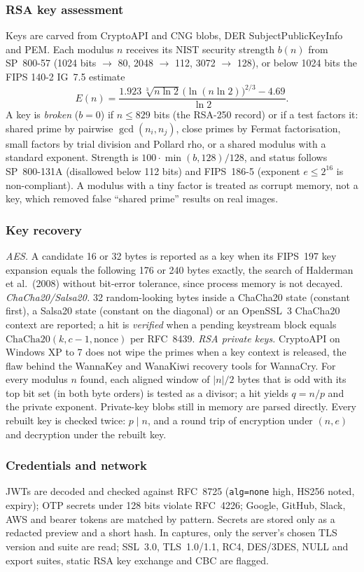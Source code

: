 \subsubsection{RSA key assessment}
Keys are carved from CryptoAPI and CNG blobs, DER SubjectPublicKeyInfo and PEM. Each modulus $n$ receives its
NIST security strength $b(n)$ from SP~800-57 (1024 bits $\to$ 80, 2048 $\to$ 112,
3072 $\to$ 128), or below 1024 bits the FIPS 140-2 IG~7.5 estimate
\begin{equation}
  E(n) = \frac{1.923\,\sqrt[3]{n\ln 2}\,\big(\ln(n\ln 2)\big)^{2/3} - 4.69}{\ln 2}.
\end{equation}
A key is \emph{broken} ($b=0$) if $n \le 829$ bits (the RSA-250 record) or if a test factors it:
shared prime by pairwise $\gcd(n_i,n_j)$, close primes by Fermat factorisation, small
factors by trial division and Pollard rho, or a shared modulus with a standard exponent. Strength is
$100\cdot\min(b,128)/128$, and status follows SP~800-131A (disallowed below 112 bits) and
FIPS~186-5 (exponent $e \le 2^{16}$ is non-compliant). A modulus with a tiny factor is treated
as corrupt memory, not a key, which removed false ``shared prime'' results on real images.

\subsubsection{Key recovery}
\textit{AES.} A candidate 16 or 32 bytes is reported as a key when its FIPS~197 key expansion
equals the following 176 or 240 bytes exactly, the search of Halderman et al.\ (2008) without
bit-error tolerance, since process memory is not decayed.
\textit{ChaCha20/Salsa20.} 32 random-looking bytes inside a ChaCha20 state (constant first), a Salsa20 state
(constant on the diagonal) or an OpenSSL~3 ChaCha20 context are reported; a hit is \emph{verified} when a
pending keystream block equals $\mathrm{ChaCha20}(k, c-1, \text{nonce})$ per RFC~8439.
\textit{RSA private keys.} CryptoAPI on Windows XP to 7 does not wipe the primes when a key context is
released, the flaw behind the WannaKey and WanaKiwi recovery tools for WannaCry. For every modulus $n$ found,
each aligned window of $|n|/2$ bytes that is odd with its top bit set (in both byte orders) is tested as a
divisor; a hit yields $q=n/p$ and the private exponent. Private-key blobs still in memory are parsed directly.
Every rebuilt key is checked twice: $p \mid n$, and a round trip of encryption under $(n,e)$ and decryption
under the rebuilt key.

\subsubsection{Credentials and network}
JWTs are decoded and checked against RFC~8725 (\texttt{alg=none} high, HS256 noted, expiry);
OTP secrets under 128 bits violate RFC~4226; Google, GitHub, Slack, AWS and bearer tokens are
matched by pattern. Secrets are stored only as a redacted preview and a short hash. In captures, only the
server's chosen TLS version and suite are read; SSL~3.0, TLS~1.0/1.1, RC4, DES/3DES, NULL and
export suites, static RSA key exchange and CBC are flagged.

